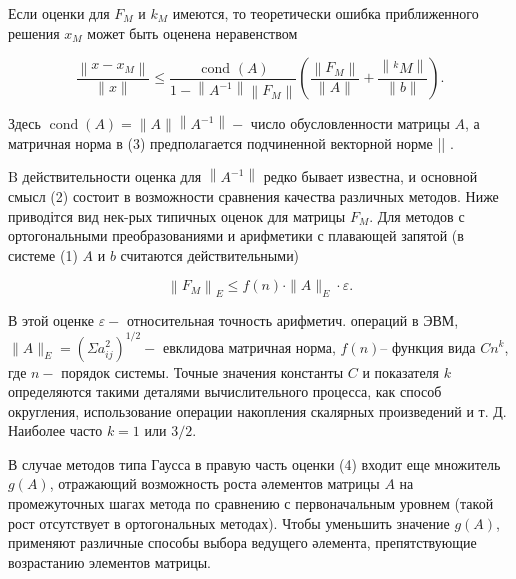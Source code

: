 \documentclass[10pt]{article}
\begin{document}
Если оценки для $F_{M}$ и $k_{M}$ имеются, то теоретически ошибка приближенного решения $x_{M}$ может быть оценена неравенством



\[

\frac{\left\|x-x_{M}\right\|}{\|x\|} \leqslant \frac{\text { cond }(A)}{1-\left\|A^{-1}\right\|\left\|F_{M}\right\|}\left(\frac{\left\|F_{M}\right\|}{\|A\|}+\frac{\left\|{ }^{k} M\right\|}{\|b\|}\right) .

\]



Здесь $\operatorname{cond}(A)=\|A\|\left\|A^{-1}\right\|-$ число обусловленности матрицы $A$, а матричная норма в (3) предполагается подчиненной векторной норме || .



$\mathrm{B}$ действительности оценка для $\left\|A^{-1}\right\|$ редко бывает известна, и основной смысл (2) состоит в возможности сравнения качества различных методов. Ниже приводітся вид нек-рых типичных оценок для матрицы $F_{M}$. Для методов с ортогональными преобразованиями и арифметики с плавающей запятой (в системе (1) $A$ и $b$ считаются действительными)



\[

\left\|F_{M}\right\|_{E} \leqslant f(n) \cdot\|A\|_{E} \cdot \varepsilon .

\]



В этой оценке $\varepsilon-$ относительная точность арифметич. операций в ЭВМ, $\|A\|_{E}=\left(\Sigma a_{i j}^{2}\right)^{1 / 2}-$ евклидова матричная норма, $f(n)$-- функция вида $C n^{k}$, где $n-$ порядок системы. Точные значения константы $C$ и показателя $k$ определяются такими деталями вычислительного процесса, как способ округления, использование операции накопления скалярных произведений и т. Д. Наиболее часто $k=1$ или $3 / 2$.



В случае методов типа Гаусса в правую часть оценки (4) входит еще множитель $g(A)$, отражающий возможность роста әлементов матрицы $A$ на промежуточных шагах метода по сравнению с первоначальным уровнем (такой рост отсутствует в ортогональных методах). Чтобы уменьшить значение $g(A)$, применяют различные способы выбора ведущего әлемента, препятствующие возрастанию элементов матрицы.
\end{document}
